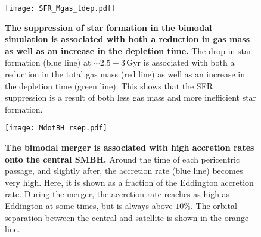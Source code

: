 \documentclass[twocolumn,linenumbers,trackchanges]{aastex631}
\newcommand{\Gyr}{\ensuremath{\textrm{Gyr}}}
\begin{document}
\begin{figure*}
  \centering
  \texttt{[image: SFR\_Mgas\_tdep.pdf]}
  \caption{\textbf{The suppression of star formation in the bimodal simulation is associated with both a reduction in gas mass as well as an increase in the depletion time.} The drop in star formation (blue line) at $\sim2.5-3\,\Gyr$ is associated with both a reduction in the total gas mass (red line) as well as an increase in the depletion time (green line). This shows that the SFR suppression is a result of both less gas mass and more inefficient star formation.}
  \label{fig:SFR_Mgas_tdep}
\end{figure*}

\begin{figure}
  \centering
  \texttt{[image: MdotBH\_rsep.pdf]}
  \caption{\textbf{The bimodal merger is associated with high accretion rates onto the central SMBH.} Around the time of each pericentric passage, and slightly after, the accretion rate (blue line) becomes very high. Here, it is shown as a fraction of the Eddington accretion rate. During the merger, the accretion rate reaches as high as Eddington at some times, but is always above $10\%$. The orbital separation between the central and satellite is shown in the orange line.}
  \label{fig:MdotBH_rsep}
\end{figure}
\end{document}
